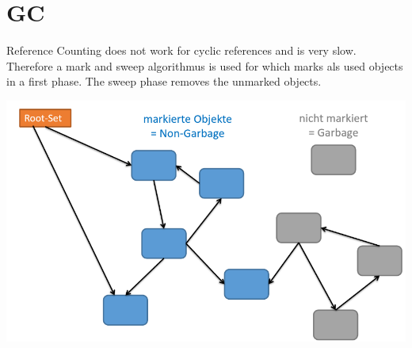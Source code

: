 \section{GC}
Reference Counting does not work for cyclic references and is very slow. Therefore a mark and sweep algorithmus is used for which marks als used objects in a first phase. The sweep phase removes the unmarked objects.
\begin{center}
	\includegraphics[width=\columnwidth]{Images/gc}
\end{center}
